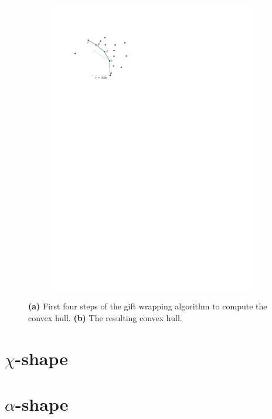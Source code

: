 \begin{figure}
\begin{subfigure}[b]{0.4\linewidth}
    \includegraphics[page=2,width=\textwidth]{figs/movingarm.pdf}
    \caption{}
  \end{subfigure}
  \caption{\textbf{(a)} First four steps of the gift wrapping algorithm to compute the convex hull. \textbf{(b)} The resulting convex hull.}
\label{fig:movingarm}
\end{figure}

%
\section{$\chi$-shape}

%
\section{$\alpha$-shape}

%
